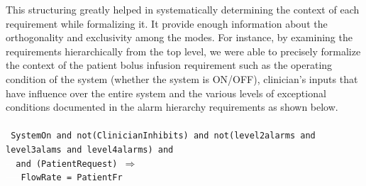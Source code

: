 This structuring greatly helped in systematically determining the context of each requirement while formalizing it. It provide enough information about the orthogonality and exclusivity among the modes. For instance, by examining the requirements hierarchically from the top level, we were able to precisely formalize the context of the patient bolus infusion requirement such as the operating condition of the system (whether the system is ON/OFF), clinician's inputs that have influence over the entire system and the various levels of exceptional conditions documented in the alarm hierarchy requirements as shown below.
\\\\
\footnotesize{\texttt{
SystemOn~and~not(ClinicianInhibits) and not(level2alarms and level3alams and level4alarms) and \\ \textcolor{white}{---}~and~(PatientRequest)~$\Rightarrow$ \\
\textcolor{white}{--------}FlowRate~=~PatientFr}}
\\\normalsize{}\\

